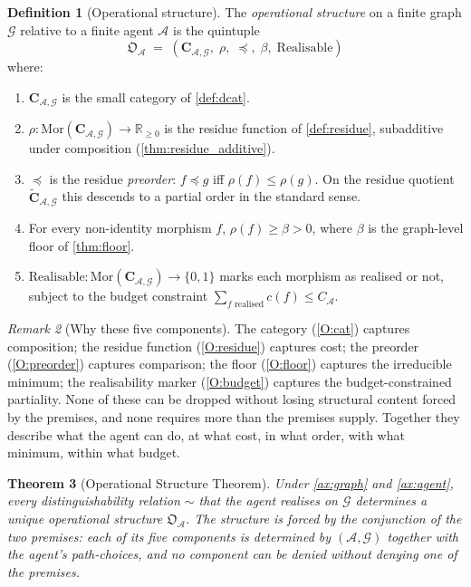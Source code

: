 \documentclass[11pt,twocolumn,a4paper]{article}
\theoremstyle{thmstyle}
\newtheorem{theorem}{Theorem}[section]
\theoremstyle{definition}
\newtheorem{definition}[theorem]{Definition}
\theoremstyle{remark}
\newtheorem{remark}[theorem]{Remark}
\newcommand{\R}{\mathbb{R}}
\newcommand{\Graph}{\mathcal{G}}
\newcommand{\Agent}{\mathcal{A}}
\newcommand{\Res}{\rho}
\newcommand{\floor}{\beta}
\newcommand{\OpStr}{\mathfrak{O}}
\begin{document}
\begin{definition}[Operational structure]
\label{def:opstr}
The \emph{operational structure} on a finite graph $\Graph$
relative to a finite agent $\Agent$ is the quintuple
\[
  \OpStr_\Agent \;=\;
  (\mathbf{C}_{\Agent,\Graph},\; \Res,\; \preceq,\; \floor,\;
  \mathrm{Realisable})
\]
where:
\begin{enumerate}[label=(O\arabic*),leftmargin=2.6em,nosep]
\item\label{O:cat} $\mathbf{C}_{\Agent,\Graph}$ is the small
category of \cref{def:dcat}.
\item\label{O:residue} $\Res: \mathrm{Mor}(\mathbf{C}_{\Agent,
\Graph}) \to \R_{\geq 0}$ is the residue function of
\cref{def:residue}, subadditive under composition
(\cref{thm:residue_additive}).
\item\label{O:preorder} $\preceq$ is the residue \emph{preorder}:
$f \preceq g$ iff $\Res(f) \leq \Res(g)$. On the residue quotient
$\widetilde{\mathbf{C}}_{\Agent,\Graph}$ this descends to a partial
order in the standard sense.
\item\label{O:floor} For every non-identity morphism $f$,
$\Res(f) \geq \floor > 0$, where $\floor$ is the graph-level floor
of \cref{thm:floor}.
\item\label{O:budget} $\mathrm{Realisable}: \mathrm{Mor}(\mathbf{C}_
{\Agent,\Graph}) \to \{0,1\}$ marks each morphism as realised or
not, subject to the budget constraint
$\sum_{f\text{ realised}} c(f) \leq C_\Agent$.
\end{enumerate}
\end{definition}

\begin{remark}[Why these five components]
\label{rem:five}
The category (\ref{O:cat}) captures composition; the residue
function (\ref{O:residue}) captures cost; the preorder
(\ref{O:preorder}) captures comparison; the floor (\ref{O:floor})
captures the irreducible minimum; the realisability marker
(\ref{O:budget}) captures the budget-constrained partiality. None
of these can be dropped without losing structural content forced by
the premises, and none requires more than the premises supply.
Together they describe what the agent can do, at what cost, in what
order, with what minimum, within what budget.
\end{remark}

\begin{theorem}[Operational Structure Theorem]
\label{thm:opstructure}
Under \cref{ax:graph} and \cref{ax:agent}, every distinguishability
relation $\sim$ that the agent realises on $\Graph$ determines a
unique operational structure $\OpStr_\Agent$. The structure is
forced by the conjunction of the two premises: each of its five
components is determined by $(\Agent, \Graph)$ together with the
agent's path-choices, and no component can be denied without
denying one of the premises.
\end{theorem}
\end{document}
